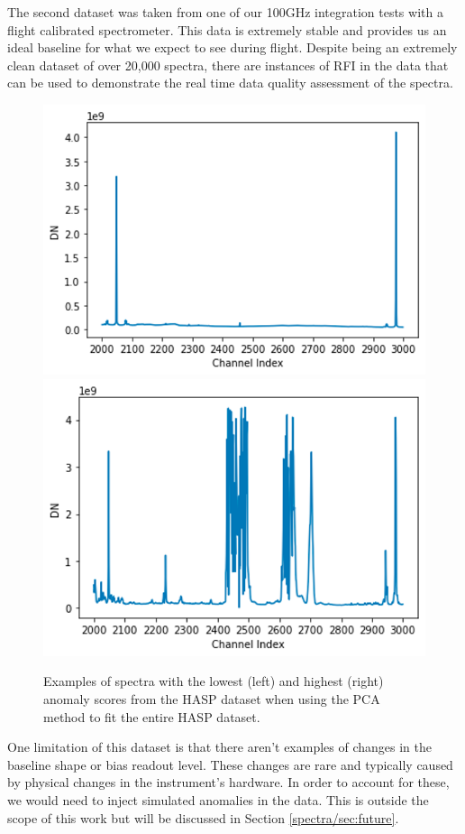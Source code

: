 The second dataset was taken from one of our 100GHz integration tests with a flight calibrated spectrometer. 
This data is extremely stable and provides us an ideal baseline for what we expect to see during flight.
Despite being an extremely clean dataset of over 20,000 spectra, there are instances of RFI in the data that can be used to demonstrate the real time data quality assessment of the spectra. 

\begin{figure}
    \centering
    \includegraphics[width=0.49\linewidth]{figs/spectra/hasp1.png}
    \includegraphics[width=0.49\linewidth]{figs/spectra/hasp2.png}
    \caption{Examples of spectra with the lowest (left) and highest (right) anomaly scores from the HASP dataset when using the PCA method to fit the entire HASP dataset.}
    \label{spectra/fig:hasp}
\end{figure}

One limitation of this dataset is that there aren't examples of changes in the baseline shape or bias readout level. 
These changes are rare and typically caused by physical changes in the instrument's hardware. 
In order to account for these, we would need to inject simulated anomalies in the data.
This is outside the scope of this work but will be discussed in Section \ref{spectra/sec:future}.


